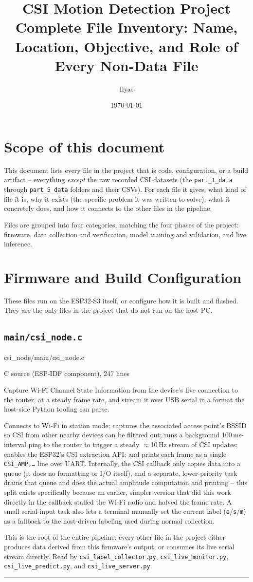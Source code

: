 \documentclass[11pt,a4paper]{article}
\title{\textbf{CSI Motion Detection Project}\\
\large Complete File Inventory: Name, Location, Objective, and Role of Every Non-Data File}
\author{Ilyas}
\date{\today}
\newcommand{\filepath}[1]{{\small\ttfamily\color{pathgray}#1}}
\newcommand{\fileentry}[6]{%
    \subsection{\texttt{#1}}
    \filepath{#2}
    \vspace{0.15cm}
    \begin{description}[leftmargin=2.6cm, style=nextline]
        \item[Type] #3
        \item[Objective] #4
        \item[Role] #5
        \item[Connections] #6
    \end{description}
    \vspace{0.2cm}
    \hrule
    \vspace{0.3cm}
}
\begin{document}
\maketitle
\tableofcontents
\newpage

\section{Scope of this document}

This document lists every file in the project that is code, configuration,
or a build artifact -- everything \emph{except} the raw recorded CSI
datasets (the \texttt{part\_1\_data} through \texttt{part\_5\_data}
folders and their CSVs). For each file it gives: what kind of file it is,
why it exists (the specific problem it was written to solve), what it
concretely does, and how it connects to the other files in the pipeline.

Files are grouped into four categories, matching the four phases of the
project: firmware, data collection and verification, model training and
validation, and live inference.

\section{Firmware and Build Configuration}

These files run on the ESP32-S3 itself, or configure how it is built and
flashed. They are the only files in the project that do not run on the
host PC.

\fileentry
{main/csi\_node.c}
{csi\_node/main/csi\_node.c}
{C source (ESP-IDF component), 247 lines}
{Capture Wi-Fi Channel State Information from the device's live
    connection to the router, at a steady frame rate, and stream it over
    USB serial in a format the host-side Python tooling can parse.}
{Connects to Wi-Fi in station mode; captures the associated access
    point's BSSID so CSI from other nearby devices can be filtered out;
    runs a background 100\,ms-interval ping to the router to trigger a
    steady \(\approx\)10\,Hz stream of CSI updates; enables the ESP32's
    CSI extraction API; and prints each frame as a single
    \texttt{CSI\_AMP,\ldots} line over UART. Internally, the CSI callback
    only copies data into a queue (it does no formatting or I/O itself),
    and a separate, lower-priority task drains that queue and does the
    actual amplitude computation and printing -- this split exists
    specifically because an earlier, simpler version that did this work
    directly in the callback stalled the Wi-Fi radio and halved the
    frame rate. A small serial-input task also lets a terminal manually
    set the current label (\texttt{e}/\texttt{s}/\texttt{m}) as a
    fallback to the host-driven labeling used during normal collection.}
{This is the root of the entire pipeline: every other file in the
    project either produces data derived from this firmware's output, or
    consumes its live serial stream directly. Read by
    \texttt{csi\_label\_collector.py}, \texttt{csi\_live\_monitor.py},
    \texttt{csi\_live\_predict.py}, and \texttt{csi\_live\_server.py}.}
\end{document}
